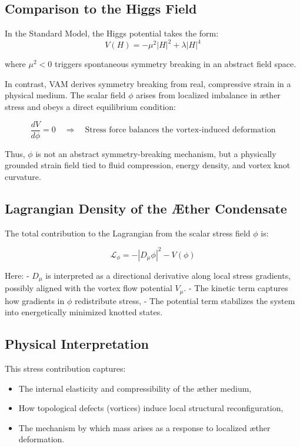 \documentclass[12pt]{article}
\begin{document}
\subsection*{Comparison to the Higgs Field}

In the Standard Model, the Higgs potential takes the form:
\[
V(H) = -\mu^2 |H|^2 + \lambda |H|^4
\]

where $\mu^2 < 0$ triggers spontaneous symmetry breaking in an abstract field space.

In contrast, VAM derives symmetry breaking from real, compressive strain in a physical medium. The scalar field $\phi$ arises from localized imbalance in æther stress and obeys a direct equilibrium condition:

\[
\frac{dV}{d\phi} = 0 \quad \Rightarrow \quad \text{Stress force balances the vortex-induced deformation}
\]

Thus, $\phi$ is not an abstract symmetry-breaking mechanism, but a physically grounded strain field tied to fluid compression, energy density, and vortex knot curvature.

\subsection*{Lagrangian Density of the Æther Condensate}

The total contribution to the Lagrangian from the scalar stress field $\phi$ is:

\[
\mathcal{L}_\phi = -|D_\mu \phi|^2 - V(\phi)
\]

Here:
- $D_\mu$ is interpreted as a directional derivative along local stress gradients, possibly aligned with the vortex flow potential $V_\mu$.
- The kinetic term captures how gradients in $\phi$ redistribute stress,
- The potential term stabilizes the system into energetically minimized knotted states.

\subsection*{Physical Interpretation}

This stress contribution captures:
\begin{itemize}
  \item The internal elasticity and compressibility of the æther medium,
  \item How topological defects (vortices) induce local structural reconfiguration,
  \item The mechanism by which mass arises as a response to localized æther deformation.
\end{itemize}
\end{document}
